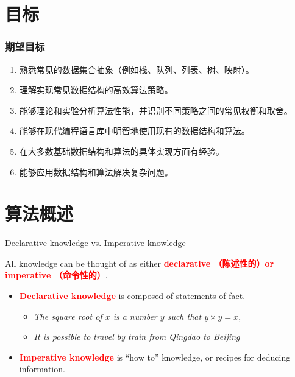 \documentclass{sintefbeamer}
\begin{document}
\section{目标}

\begin{frame}
  \frametitle{期望目标}

  \begin{enumerate}
    \item 熟悉常见的数据集合抽象（例如栈、队列、列表、树、映射）。
    \item 理解实现常见数据结构的高效算法策略。
    \item 能够理论和实验分析算法性能，并识别不同策略之间的常见权衡和取舍。
    \item 能够在现代编程语言库中明智地使用现有的数据结构和算法。
    \item 在大多数基础数据结构和算法的具体实现方面有经验。
    \item 能够应用数据结构和算法解决复杂问题。
  \end{enumerate}

\end{frame}

\section{算法概述}

\begin{frame}{Declarative knowledge vs. Imperative knowledge}

  All knowledge can be thought of as either \textcolor{red}{\textbf{declarative （陈述性的）or imperative （命令性的）}}.

  \begin{itemize}[<+->]
    \item \textcolor{red}{\textbf{Declarative knowledge}} is composed of statements of fact.
          \begin{itemize}
            \item \textit{The square root of $x$ is a number $y$ such that $y \times y = x$},
            \item \textit{It is possible to travel by train from Qingdao to Beijing}
          \end{itemize}
    \item \textcolor{red}{\textbf{Imperative knowledge}} is ``how to'' knowledge, or recipes for deducing information.
  \end{itemize}

\end{frame}
\end{document}
